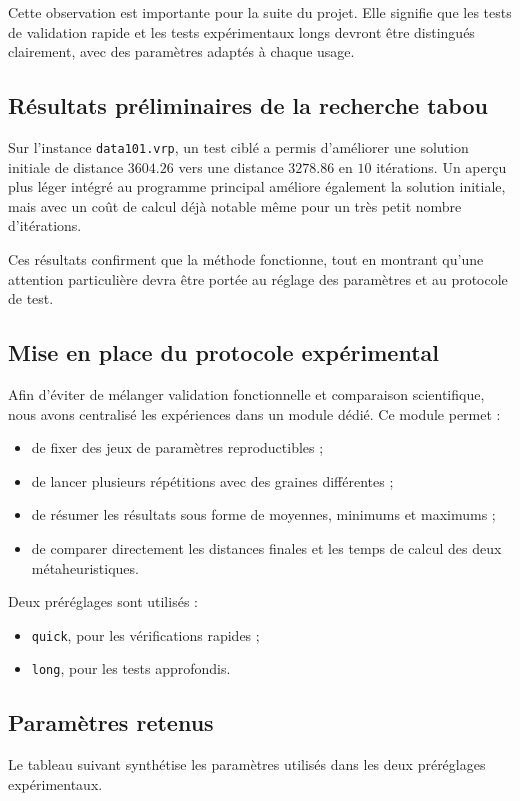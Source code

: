 \documentclass[11pt,a4paper]{article}
\begin{document}
Cette observation est importante pour la suite du projet. Elle signifie que les tests de validation rapide et les tests expérimentaux longs devront être distingués clairement, avec des paramètres adaptés à chaque usage.

\subsection{Résultats préliminaires de la recherche tabou}
Sur l'instance \texttt{data101.vrp}, un test ciblé a permis d'améliorer une solution initiale de distance \(3604.26\) vers une distance \(3278.86\) en \(10\) itérations. Un aperçu plus léger intégré au programme principal améliore également la solution initiale, mais avec un coût de calcul déjà notable même pour un très petit nombre d'itérations.

Ces résultats confirment que la méthode fonctionne, tout en montrant qu'une attention particulière devra être portée au réglage des paramètres et au protocole de test.

\subsection{Mise en place du protocole expérimental}
Afin d'éviter de mélanger validation fonctionnelle et comparaison scientifique, nous avons centralisé les expériences dans un module dédié. Ce module permet :
\begin{itemize}
    \item de fixer des jeux de paramètres reproductibles ;
    \item de lancer plusieurs répétitions avec des graines différentes ;
    \item de résumer les résultats sous forme de moyennes, minimums et maximums ;
    \item de comparer directement les distances finales et les temps de calcul des deux métaheuristiques.
\end{itemize}

Deux préréglages sont utilisés :
\begin{itemize}
    \item \texttt{quick}, pour les vérifications rapides ;
    \item \texttt{long}, pour les tests approfondis.
\end{itemize}

\subsection{Paramètres retenus}
Le tableau suivant synthétise les paramètres utilisés dans les deux préréglages expérimentaux.
\end{document}
